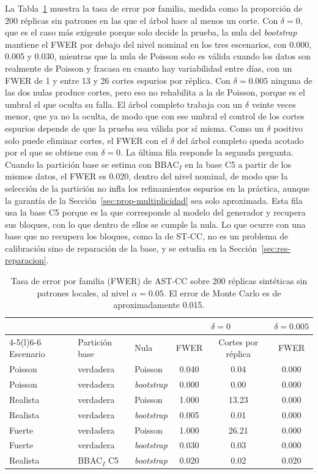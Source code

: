 La Tabla~\ref{tab:res-calibracion} muestra la tasa de error por familia, medida
como la proporción de 200 réplicas sin patrones en las que el árbol hace al menos un
corte. Con $\delta = 0$, que es el caso más exigente porque solo decide la prueba,
la nula del \emph{bootstrap} mantiene el FWER por debajo del nivel nominal en los
tres escenarios, con 0.000, 0.005 y 0.030, mientras que la nula de Poisson solo es
válida cuando los datos son realmente de Poisson y fracasa en cuanto hay
variabilidad entre días, con un FWER de 1 y entre 13 y 26 cortes espurios por
réplica. Con $\delta = 0.005$ ninguna de las dos nulas produce cortes, pero eso no
rehabilita a la de Poisson, porque es el umbral el que oculta su falla. El árbol
completo trabaja con un $\delta$ veinte veces menor, que ya no la oculta, de modo
que con ese umbral el control de los cortes espurios depende de que la prueba sea
válida por sí misma. Como un $\delta$ positivo solo puede eliminar cortes, el
FWER con el $\delta$ del árbol completo queda acotado por el que se obtiene con
$\delta = 0$. La última fila responde la segunda pregunta. Cuando la partición
base se estima con BBAC$_I$ en la base C5 a partir de los mismos datos, el FWER es
0.020, dentro del nivel nominal, de modo que la selección de la partición no
infla los refinamientos espurios en la práctica, aunque la garantía de la
Sección~\ref{sec:prop-multiplicidad} sea solo aproximada. Esta fila usa la base C5
porque es la que corresponde al modelo del generador y recupera sus bloques, con lo
que dentro de ellos se cumple la nula. Lo que ocurre con una base que no
recupera los bloques, como la de ST-CC, no es un problema de calibración sino de
reparación de la base, y se estudia en la Sección~\ref{sec:res-reparacion}.

\begin{table}[t]
\centering
\small
\begin{tabular}{@{}lllccc@{}}
\toprule
 & & & \multicolumn{2}{c}{$\delta = 0$} & $\delta = 0.005$ \\
\cmidrule(lr){4-5}\cmidrule(l){6-6}
Escenario & Partición base & Nula & FWER & Cortes por réplica & FWER \\
\midrule
Poisson  & verdadera & Poisson             & 0.040 & 0.04  & 0.000 \\
Poisson  & verdadera & \emph{bootstrap}    & 0.000 & 0.00  & 0.000 \\
Realista & verdadera & Poisson             & 1.000 & 13.23 & 0.000 \\
Realista & verdadera & \emph{bootstrap}    & 0.005 & 0.01  & 0.000 \\
Fuerte   & verdadera & Poisson             & 1.000 & 26.21 & 0.000 \\
Fuerte   & verdadera & \emph{bootstrap}    & 0.030 & 0.03  & 0.000 \\
Realista & BBAC$_I$ C5 & \emph{bootstrap}  & 0.020 & 0.02  & 0.020 \\
\bottomrule
\end{tabular}
\caption{Tasa de error por familia (FWER) de AST-CC sobre 200 réplicas sintéticas
sin patrones locales, al nivel $\alpha = 0.05$. El error de Monte Carlo es de
aproximadamente 0.015.}
\label{tab:res-calibracion}
\end{table}

